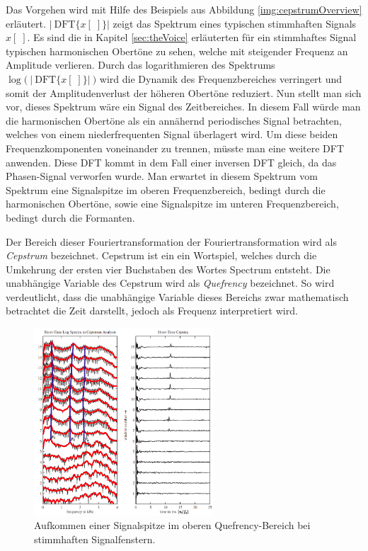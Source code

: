 Das Vorgehen wird mit Hilfe des Beispiels aus Abbildung \ref{img:cepstrumOverview} erläutert. $ |\ \text{DFT}\{x[\;]\} \big| $  zeigt das Spektrum eines \glqq typischen stimmhaften\grqq{} Signals $x[\;]$. Es sind die in Kapitel \ref{sec:theVoice} erläuterten für ein stimmhaftes Signal typischen harmonischen Obertöne zu sehen, welche mit steigender Frequenz an Amplitude verlieren. Durch das logarithmieren des Spektrums $\log \big(\ |\ \text{DFT}\{x[\;]\} |\ \big)$ wird die Dynamik des Frequenzbereiches verringert und somit der Amplitudenverlust der höheren Obertöne reduziert. Nun stellt man sich vor, dieses Spektrum wäre ein Signal des Zeitbereiches. In diesem Fall würde man die harmonischen Obertöne als ein annähernd periodisches Signal betrachten, welches von einem niederfrequenten Signal überlagert wird. Um diese beiden Frequenzkomponenten voneinander zu trennen, müsste man eine weitere DFT anwenden. Diese DFT kommt in dem Fall einer inversen DFT gleich, da das Phasen-Signal verworfen wurde. Man erwartet in diesem \glqq Spektrum vom Spektrum\grqq{} eine Signalspitze im \glqq oberen Frequenzbereich\grqq , bedingt durch die harmonischen Obertöne, sowie eine Signalspitze im \glqq unteren Frequenzbereich\grqq, bedingt durch die Formanten.\cite[\emph{Cepstral analysis}]{ricardo_ceps}

Der Bereich dieser \glqq Fouriertransformation der Fouriertransformation\grqq{} wird als \emph{Cepstrum} bezeichnet. Cepstrum ist ein ein Wortspiel, welches durch die Umkehrung der ersten vier Buchstaben des Wortes \glqq Spectrum\grqq{} entsteht. Die unabhängige Variable des Cepstrum wird als \emph{Quefrency} bezeichnet. So wird verdeutlicht, dass die unabhängige Variable dieses Bereichs zwar mathematisch betrachtet die Zeit darstellt, jedoch als Frequenz interpretiert wird.\cite[S. 7]{ricardo_ceps}

\begin{figure}[h]
	\centering
	\includegraphics[width=0.6\textwidth]{bilder/cepstrum05.png}
	\caption[Aufkommen einer Signalspitze im oberen Quefrency-Bereich]{Aufkommen einer Signalspitze im oberen Quefrency-Bereich bei stimmhaften Signalfenstern. \cite[\emph{Cepstral Analysis}, S. 17]{ricardo_ceps}}
	\label{img:cepstrumVoicedPeak}
\end{figure}	

